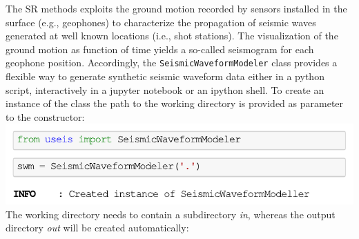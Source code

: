 \documentclass[a4paper,fleqn]{cas-sc}
\begin{document}
The SR methods exploits the ground motion recorded by sensors installed in the surface (e.g., geophones) to characterize the propagation of seismic waves generated at well known locations (i.e., shot stations). 
The visualization of the ground motion as function of time yields a so-called seismogram for each geophone position.
Accordingly, the \texttt{SeismicWaveformModeler} class provides a flexible way to generate synthetic seismic waveform data either in a python script, interactively in a jupyter notebook or an ipython shell. To create an instance of the class the path to the working directory is provided as parameter to the constructor:
\newline
\includegraphics[width=.5\textwidth]{./figures/create_swm.pdf}
\newline
\\The working directory needs to contain a subdirectory \textit{in}, whereas the output directory \textit{out} will be created automatically:

\end{document}
